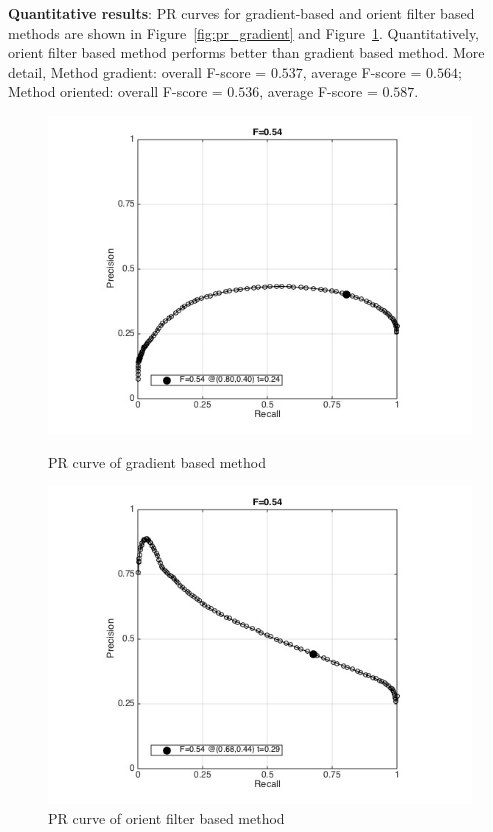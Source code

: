 \documentclass[11pt]{article}
\begin{document}
\begin{description}
\textbf{Quantitative results}: PR curves for gradient-based and orient filter based methods are shown in Figure~\ref{fig:pr_gradient} and Figure~\ref{fig:pr_orient}. Quantitatively, orient filter based method performs better than gradient based method. More detail, Method gradient: overall F-score = $0.537$, average F-score = $0.564$; Method oriented: overall F-score = $0.536$, average F-score = $0.587$. 

\begin{figure}
\begin{minipage}{0.5\textwidth}
\includegraphics[width=\linewidth]{./img/pr_full_gradient.png}
\caption{PR curve of gradient based method}
\label{fig:pr_gradient}
\end{minipage}
\quad
\begin{minipage}{0.5\textwidth}
\includegraphics[width=\linewidth]{./img/pr_full_orient.png}
\caption{PR curve of orient filter based method}
\label{fig:pr_orient}
\end{minipage}
\end{figure}



\end{description}
\end{document}
